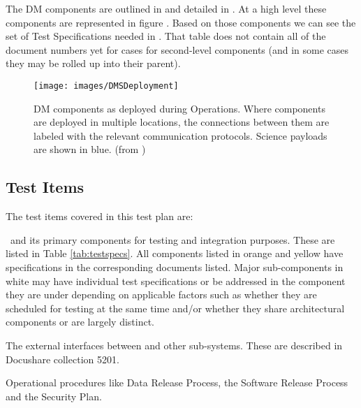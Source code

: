  The DM components are  outlined in  and detailed in . At a high level these components are represented in figure .  Based on those components we can see the set of Test Specifications needed in . That table does not contain all of the document numbers yet for cases for second-level components (and in some cases they may be rolled up into their parent). 


\begin{figure}[htbp]
	\begin{center}
		\texttt{[image: images/DMSDeployment]}
		\caption{DM components as deployed during Operations. Where components are
			deployed in multiple locations, the connections between them are labeled with
			the relevant communication protocols. Science payloads are shown in blue.
		\label{fig:dmsdeploy} (from )}
	\end{center}
\end{figure}

\subsection{Test Items}

\begin{table}
	\caption{Components from LDM-148 with the test specifications to verify them. \label{tab:testspecs}}
	
\end{table}

The test items covered in this test plan are:

\begin{itemize_single}
\item \product\ and its primary components for testing and integration purposes. These are listed in Table \ref{tab:testspecs}. All components listed in orange and yellow have specifications in the corresponding documents listed. Major sub-components in white may have individual test specifications or be addressed in the component they are under depending on applicable factors such as whether they are scheduled for testing at the same time and/or whether they share architectural components or are largely distinct. 

\item The external interfaces between \product and other sub-systems. These are described in Docushare collection 5201.

\item Operational procedures like Data Release Process, the Software Release Process and the Security Plan. 

\end{itemize_single}


